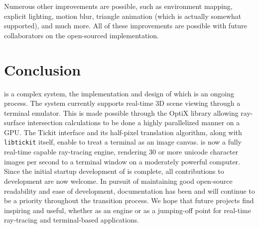 Numerous other improvements are possible, such as environment mapping, explicit lighting, motion blur, triangle animation (which is actually somewhat supported), and much more.
All of these improvements are possible with future collaborators on the open-sourced \name{} implementation.

\section{Conclusion}\label{ch:conclusion:end}

\name{} is a complex system, the implementation and design of which is an ongoing process.
The system currently supports real-time 3D scene viewing through a terminal emulator.
This is made possible through the OptiX library allowing ray-surface intersection calculations to be done a highly parallelized manner on a GPU.
The Tickit interface and its half-pixel translation algorithm, along with \texttt{libtickit} itself, enable \name{} to treat a terminal as an image canvas.
\name{} is now a fully real-time capable ray-tracing engine, rendering 30 or more unicode character images per second to a terminal window on a moderately powerful computer.
Since the initial startup development of \name{} is complete, all contributions to \name{} development are now welcome.
In pursuit of maintaining good open-source readability and ease of development, documentation has been and will continue to be a priority throughout the transition process.
We hope that future projects find \name{} inspiring and useful, whether as an engine or as a jumping-off point for real-time ray-tracing and terminal-based applications.
